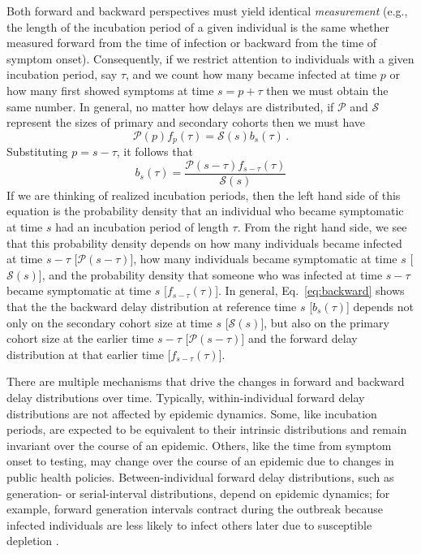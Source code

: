 \documentclass[12pt]{article}
\newcommand{\psymp}{\ensuremath{p}} %
\newcommand{\ssymp}{\ensuremath{s}} %
\newcommand{\psize}{{\mathcal P}} %
\newcommand{\ssize}{{\mathcal S}} %
\begin{document}
Both forward and backward perspectives
must yield identical \emph{measurement} (e.g., the length of the incubation
period of a given individual is the same whether measured forward from
the time of infection or backward from the time of symptom onset).
Consequently, if we restrict attention to individuals with a given
incubation period, say $\tau$, and we count how many became infected at time $\psymp$
or how many first showed symptoms at time $\ssymp=\psymp+\tau$ then we must obtain
the same number. In general, no matter how delays are distributed, if
$\mathcal P$ and $\mathcal S$ represent the sizes of primary and
secondary cohorts then we must have
\begin{equation}
\psize(\psymp) f_\psymp(\tau) = \ssize(\ssymp) b_\ssymp(\tau) \,.
\label{eq:match}
\end{equation}
Substituting $\psymp=\ssymp-\tau$, it follows that
\begin{equation}
b_\ssymp(\tau)= \frac{\psize(\ssymp-\tau) f_{\ssymp-\tau} (\tau)}{\ssize(\ssymp)}
\label{eq:backward}
\end{equation}
If we are thinking of realized incubation periods, then the left hand side of
this equation is the probability density that an individual
who became symptomatic at time $\ssymp$ had an incubation period of
length $\tau$. From the right hand side, we see that this probability
density depends on how many individuals became infected at time
$\ssymp-\tau$ [$\psize(\ssymp-\tau)$], how many individuals became
symptomatic at time $\ssymp$ [$\ssize(\ssymp)$], and the probability density
that someone who was infected at time $\ssymp-\tau$ became symptomatic at
time $\ssymp$ [$f_{\ssymp-\tau}(\tau)$]. In general, Eq.~\eqref{eq:backward}
shows that the the backward delay distribution at reference time $\ssymp$
[$b_\ssymp(\tau)$] depends not only on the secondary cohort size at time
$\ssymp$ [$\ssize(\ssymp)$], but also on the primary cohort size at the
earlier time $\ssymp-\tau$ [$\psize(\ssymp-\tau)$] and the forward delay
distribution at that earlier time [$f_{\ssymp-\tau}(\tau)$].

There are multiple mechanisms that drive the changes in forward and backward delay distributions over time.
Typically, within-individual forward delay distributions are not affected by epidemic dynamics.
Some, like incubation periods, are expected to be equivalent to their intrinsic distributions and remain invariant over the course of an epidemic.
Others, like the time from symptom onset to testing, may change over the course of an epidemic due to changes in public health policies.
Between-individual forward delay distributions, such as generation- or serial-interval distributions, depend on epidemic dynamics;
for example, forward generation intervals contract during the outbreak because infected individuals are less likely to infect others later due to susceptible depletion \citep{champredon2015intrinsic}.
\end{document}
